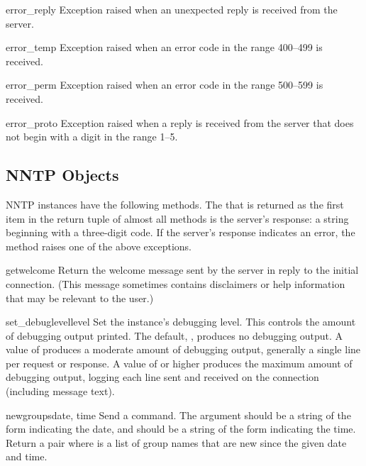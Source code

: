 \begin{excdesc}{error_reply}
Exception raised when an unexpected reply is received from the server.
\end{excdesc}

\begin{excdesc}{error_temp}
Exception raised when an error code in the range 400--499 is received.
\end{excdesc}

\begin{excdesc}{error_perm}
Exception raised when an error code in the range 500--599 is received.
\end{excdesc}

\begin{excdesc}{error_proto}
Exception raised when a reply is received from the server that does
not begin with a digit in the range 1--5.
\end{excdesc}


\subsection{NNTP Objects}
\label{nntp-objects}

NNTP instances have the following methods.  The  that is
returned as the first item in the return tuple of almost all methods
is the server's response: a string beginning with a three-digit code.
If the server's response indicates an error, the method raises one of
the above exceptions.


\begin{methoddesc}{getwelcome}{}
Return the welcome message sent by the server in reply to the initial
connection.  (This message sometimes contains disclaimers or help
information that may be relevant to the user.)
\end{methoddesc}

\begin{methoddesc}{set_debuglevel}{level}
Set the instance's debugging level.  This controls the amount of
debugging output printed.  The default, , produces no debugging
output.  A value of  produces a moderate amount of debugging
output, generally a single line per request or response.  A value of
 or higher produces the maximum amount of debugging output,
logging each line sent and received on the connection (including
message text).
\end{methoddesc}

\begin{methoddesc}{newgroups}{date, time}
Send a  command.  The  argument should be a
string of the form  indicating the
date, and  should be a string of the form
 indicating the time.  Return a pair
 where  is a list of
group names that are new since the given date and time.
\end{methoddesc}

